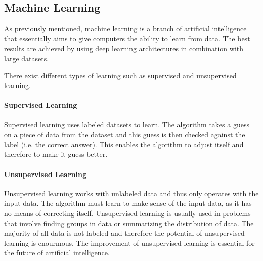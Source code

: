 \subsection{Machine Learning}
\label{subsec:ml}

As previously mentioned, machine learning is a branch of artificial intelligence that essentially aims to give computers the ability to learn from data.
The best results are achieved by using deep learning architectures in combination with large datasets.

There exist different types of learning such as supervised and unsupervised learning.

\paragraph{Supervised Learning}
Supervised learning uses labeled datasets to learn.
The algorithm takes a guess on a piece of data from the dataset and this guess is then checked against the label (i.e. the correct answer).
This enables the algorithm to adjust itself and therefore to make it guess better.

\paragraph{Unsupervised Learning}
Unsupervised learning works with unlabeled data and thus only operates with the input data.
The algorithm must learn to make sense of the input data, as it has no means of correcting itself.
Unsupervised learning is usually used in problems that involve finding groups in data or summarizing the distribution of data.
The majority of all data is not labeled and therefore the potential of unsupervised learning is enourmous.
The improvement of unsupervised learning is essential for the future of artificial intelligence.
